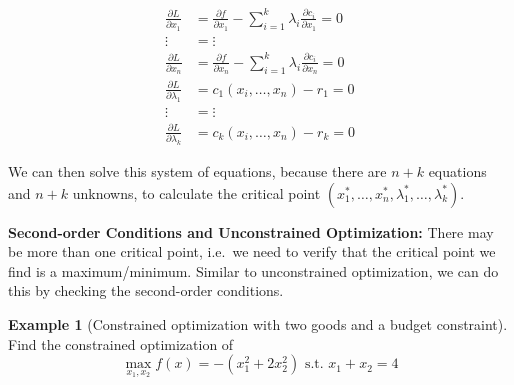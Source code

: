 \documentclass[
]{book}
\theoremstyle{definition}
\theoremstyle{definition}
\newtheorem{example}{Example}[chapter]
\theoremstyle{definition}
\theoremstyle{remark}
\begin{document}
\begin{align*}
\frac{\partial L}{\partial x_1} &= \frac{\partial f}{\partial x_1} - \sum_{i = 1}^k\lambda_i\frac{\partial c_i}{\partial x_1} = 0\\
 \vdots &= \vdots \nonumber \\ 
\frac{\partial L}{\partial x_n}  &= \frac{\partial f}{\partial x_n} - \sum_{i = 1}^k\lambda_i\frac{\partial c_i}{\partial x_n} = 0\\
\frac{\partial L}{\partial \lambda_1} &= c_1(x_i, \dots, x_n) - r_1 =  0\\
 \vdots &= \vdots \nonumber \\
\frac{\partial L}{\partial \lambda_k} &= c_k(x_i, \dots, x_n) - r_k = 0
\end{align*}

We can then solve this system of equations, because there are \(n+k\) equations and \(n+k\) unknowns, to calculate the critical point \((x_1^*,\dots,x_n^*,\lambda_1^*,\dots,\lambda_k^*)\).

\textbf{Second-order Conditions and Unconstrained Optimization:} There may be more than one critical point, i.e.~we need to verify that the critical point we find is a maximum/minimum. Similar to unconstrained optimization, we can do this by checking the second-order conditions.

\begin{example}[Constrained optimization with two goods and a budget constraint]
\protect\hypertarget{exm:unnamed-chunk-60}{}{\label{exm:unnamed-chunk-60} {} }
Find the constrained optimization of
\[\max_{x_1,x_2} f(x) = -(x_1^2 + 2x_2^2) \text{ s.t. } x_1 + x_2 = 4\]
\end{example}
\end{document}
